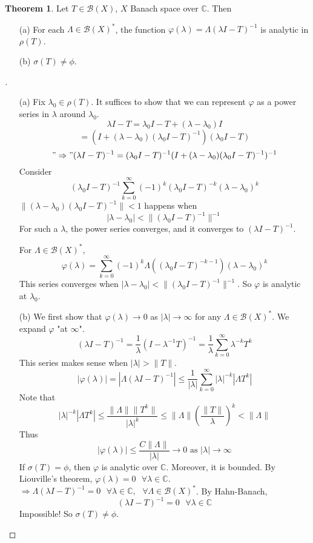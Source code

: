 \documentclass{article}
\newcommand{\sfa}{\text{  } \forall}
\theoremstyle{definition}
\newtheorem{thm}{Theorem}
\newenvironment{proofs}[1][\proofname]{%
  \begin{proof}[#1]$ $\par\nobreak\ignorespaces
}{%
  \end{proof}
}
\begin{document}
\begin{thm}
	Let $T \in \mathcal{B}(X)$, $X$ Banach space over $\mathbb{C}$.
	Then 
	\begin{enumerate}
		\item[(a)] For each $\Lambda \in \mathcal{B}(X)^*$, the function $\varphi (\lambda) = \Lambda (\lambda I - T)^{-1}$ is analytic in $\rho(T)$.

		\item[(b)] $\sigma(T) \neq \phi$.
	\end{enumerate}
\end{thm}

\begin{proofs}
	\begin{enumerate}
		\item[(a)] Fix $\lambda_0 \in \rho(T)$.
			It suffices to show that we can represent $\varphi$ as a power series in $\lambda$ around $\lambda_0$.
			\[
				\lambda I - T = \lambda_0 I - T + (\lambda - \lambda_0) I
			\]
			\[
				= (I + (\lambda - \lambda_0)(\lambda_0 I - T)^{-1})(\lambda_0 I - T)
			\]
			\[
				"\Rightarrow" (\lambda I - T)^{-1} = (\lambda_0 I - T)^{-1} (I + (\lambda - \lambda_0)(\lambda_0 I - T)^{-1})^{-1}
			\]
			Consider
			\[
				(\lambda_0 I - T)^{-1} \sum_{k = 0}^\infty (-1)^k (\lambda_0 I - T)^{-k} (\lambda - \lambda_0)^k
			\]
			$\|(\lambda - \lambda_0)(\lambda_0 I - T)^{-1}\| < 1$ happens when 
			\[
				|\lambda - \lambda_0| < \|(\lambda_0 I - T)^{-1}\|^{-1}
			\]
			For such a $\lambda$, the power series converges, and it converges to $(\lambda I - T)^{-1}$.
			\par For $\Lambda \in \mathcal{B}(X)^*$, 
			\[
				\varphi(\lambda) = \sum_{k = 0}^\infty (-1)^k \Lambda ((\lambda_0 I - T)^{-k - 1})(\lambda - \lambda_0)^k
			\]
			This series converges when $|\lambda - \lambda_0| < \|(\lambda_0 I - T)^{-1}\|^{-1}$.
			So $\varphi$ is analytic at $\lambda_0$.

		\item[(b)] We first show that $\varphi(\lambda) \to 0$ as $|\lambda| \to \infty$ for any $\Lambda \in \mathcal{B}(X)^*$.
			We expand $\varphi$ "at $\infty$".
			\[
				(\lambda I - T)^{-1} = \frac{1}{\lambda}(I - \lambda^{-1} T)^{-1} = \frac{1}{\lambda} \sum_{k = 0}^\infty \lambda^{-k} T^k
			\]
			This series makes sense when $|\lambda| > \|T\|$.
			\[
				|\varphi(\lambda)| = |\Lambda(\lambda I - T)^{-1}| \leq \frac{1}{|\lambda|} \sum_{k = 0}^\infty |\lambda|^{-k}|\Lambda T^k|
			\]
			Note that 
			\[
				|\lambda|^{-k} |\Lambda T^k| \leq \frac{\|\Lambda\| \|T^k\|}{|\lambda|^k} \leq \|\Lambda\| \left(\frac{\|T\|}{\lambda}\right)^k < \|\Lambda\|
			\]
			Thus
			\[
				|\varphi(\lambda)| \leq \frac{C\|\Lambda\|}{|\lambda|} \to 0 \text{ as } |\lambda| \to \infty
			\]
			If $\sigma(T) = \phi$, then $\varphi$ is analytic over $\mathbb{C}$.
			Moreover, it is bounded.
			By Liouville's theorem, $\varphi(\lambda) = 0 \sfa \lambda \in \mathbb{C}$.
			$\Rightarrow \Lambda(\lambda I - T)^{-1} = 0 \sfa \lambda \in \mathbb{C}, \sfa \Lambda \in \mathcal{B}(X)^*$.
			By Hahn-Banach,
			\[
				(\lambda I - T)^{-1} = 0 \sfa \lambda \in \mathbb{C}
			\]
			Impossible!
			So $\sigma(T) \neq \phi$.
	\end{enumerate}
\end{proofs}
\end{document}
